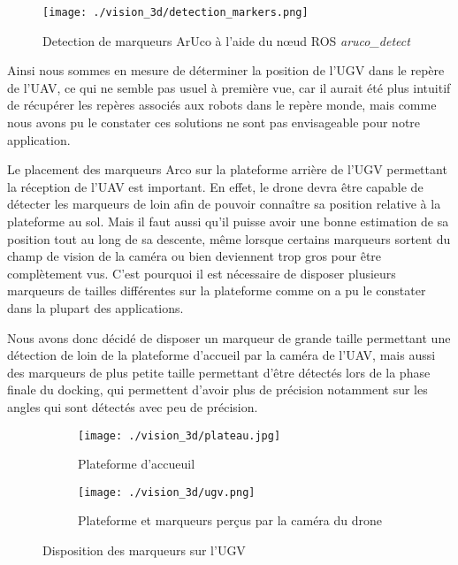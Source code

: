     \begin{figure}[!htb]
        \centering
        \texttt{[image: ./vision\_3d/detection\_markers.png]}
        \caption{Detection de marqueurs ArUco à l'aide du n\oe ud ROS \textit{aruco\_detect}}
        \label{fig:detection}
    \end{figure}

    Ainsi nous sommes en mesure de déterminer la position de l’UGV dans le repère de l’UAV, ce qui ne semble pas usuel à première vue, car il aurait été plus intuitif de récupérer les repères associés aux robots dans le repère monde, mais comme nous avons pu le constater ces solutions ne sont pas envisageable pour notre application.

    Le placement des marqueurs Arco sur la plateforme arrière de l’UGV permettant la réception de l’UAV est important. En effet, le drone devra être capable de détecter les marqueurs de loin afin de pouvoir connaître sa position relative à la plateforme au sol. Mais il faut aussi qu’il puisse avoir une bonne estimation de sa position tout au long de sa descente, même lorsque certains marqueurs sortent du champ de vision de la caméra ou bien deviennent trop gros pour être complètement vus. C’est pourquoi il est nécessaire de disposer plusieurs marqueurs de tailles différentes sur la plateforme comme on a pu le constater dans la plupart des applications. %

    Nous avons donc décidé de disposer un marqueur de grande taille permettant une détection de loin de la plateforme d’accueil par la caméra de l’UAV, mais aussi des marqueurs de plus petite taille permettant d’être détectés lors de la phase finale du docking, qui permettent d’avoir plus de précision notamment sur les angles qui sont détectés avec peu de précision.
    
    \begin{figure}[!htb]
        \centering
        \begin{subfigure}[b]{0.35\textwidth}
            \centering
            \texttt{[image: ./vision\_3d/plateau.jpg]}
            \caption{Plateforme d'accueuil}
            \label{fig:plateforme}
        \end{subfigure}
        \hfill
        \begin{subfigure}[b]{0.55\textwidth}
            \centering
            \texttt{[image: ./vision\_3d/ugv.png]}
            \caption{Plateforme et marqueurs perçus par la caméra du drone}
            \label{fig:ugv}
        \end{subfigure}
        \caption{Disposition des marqueurs sur l'UGV}
        \label{fig:marqueurs_ugv}
    \end{figure}

